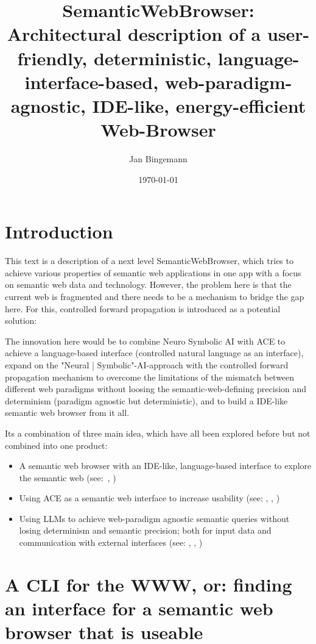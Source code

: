 \documentclass[12pt,a4paper]{article}
\title{SemanticWebBrowser:\\Architectural description of a user-friendly, deterministic, language-interface-based, web-paradigm-agnostic, IDE-like, energy-efficient Web-Browser}
\author{Jan Bingemann}
\date{\today}
\begin{document}
\maketitle

\tableofcontents
\newpage

\section{Introduction}

This text is a description of a next level SemanticWebBrowser, which tries to achieve various properties of semantic web applications in one app with a focus on semantic web data and technology. However, the problem here is that the current web is fragmented and there needs to be a mechanism to bridge the gap here. For this, controlled forward propagation is introduced as a potential solution:

The innovation here would be to combine Neuro Symbolic AI with ACE to achieve a language-based interface (controlled natural language as an interface), expand on the "Neural | Symbolic"-AI-approach with the controlled forward propagation mechanism to overcome the limitations of the mismatch between different web paradigms without loosing the semantic-web-defining precision and determinism (paradigm agnostic but deterministic), and to build a IDE-like semantic web browser from it all.

Its a combination of three main idea, which have all been explored before but not combined into one product:

\begin{itemize}
    \item A semantic web browser with an IDE-like, language-based interface to explore the semantic web (see:~\cite{semanticWebBrowser}, \cite{headlessBrowsers})
    \item Using ACE as a semantic web interface to increase usability (see: \cite{semanticWebLanguageBased}, \cite{semanticWebControlledEnglish}, \cite{semanticWebAce})
    \item Using LLMs to achieve web-paradigm agnostic semantic queries without losing determinism and semantic precision; both for input data and communication with external interfaces (see: \cite{llmAsDataTranslator}, \cite{llmForIntegratingHeterogenousData}, \cite{neuroSymbolicAi})
\end{itemize}

\section{A CLI for the WWW, or: finding an interface for a semantic web browser that is useable}
\end{document}
